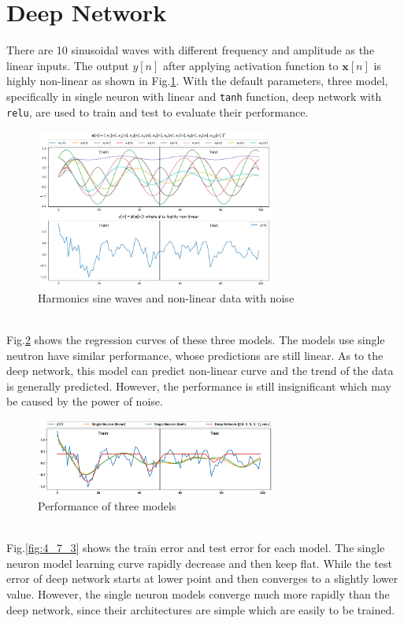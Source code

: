 \section{Deep Network}
There are 10 sinusoidal waves with different frequency and amplitude as the linear inputs. The output $y[n]$ after applying activation function to $\mathbf x[n]$ is highly non-linear as shown in Fig.\ref{fig:4_7_1}. With the default parameters, three model, specifically in single neuron with linear and \texttt{tanh} function, deep network with \texttt{relu}, are used to train and test to evaluate their performance. 
\begin{figure}[htb]
     \centering
     \includegraphics[width=0.7\textwidth]{fig/4/47a1.png}
     \caption{Harmonics sine waves and non-linear data with noise}
     \label{fig:4_7_1}
\end{figure}\\
Fig.\ref{fig:4_7_2} shows the regression curves of these three models. The models use single neutron have similar performance, whose predictions are still linear. As to the deep network, this model can predict non-linear curve and the trend of the data is generally predicted. However, the performance is still insignificant which may be caused by the power of noise.
\begin{figure}[htb]
     \centering
     \includegraphics[width=0.7\textwidth]{fig/4/47a2.eps}
     \caption{Performance of three models}
     \label{fig:4_7_2}
\end{figure}\\
Fig.\ref{fig:4_7_3} shows the train error and test error for each model. The single neuron model learning curve rapidly decrease and then keep flat. While the test error of deep network starts at lower point and then converges to a slightly lower value. However, the single neuron models converge much more rapidly than the deep network, since their architectures are simple which are easily to be trained.
